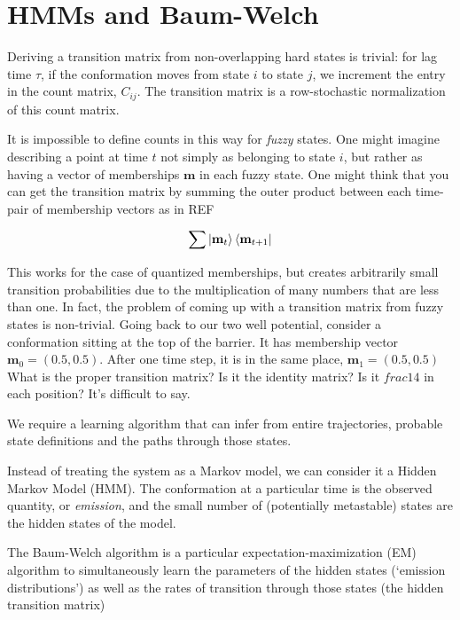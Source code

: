 \documentclass[10pt]{article}
\begin{document}
\section{HMMs and Baum-Welch}

Deriving a transition matrix from non-overlapping hard states is trivial: for lag time
$\tau$, if the conformation moves from state $i$ to state $j$, we increment the entry
in the count matrix, $C_{ij}$. The transition matrix is a row-stochastic normalization of
this count matrix.

It is impossible to define counts in this way for \textit{fuzzy} states. One might
imagine describing a point at time $t$ not simply as belonging to state $i$, but rather as 
having a vector of memberships $\mathbf{m}$ in each fuzzy state. One might think
that you can get the transition matrix by summing the outer product between each
time-pair of membership vectors as in REF

\begin{equation}
\sum \Ket{\mathbf{m}_t} \Bra{\mathbf{m}_{t+1}}
\end{equation}

This works for the case of quantized memberships, but creates
arbitrarily small transition probabilities due to the multiplication
of many numbers that are less than one. In fact, the problem
of coming up with a transition matrix from fuzzy states is non-trivial.
Going back to our two well potential, consider a conformation sitting at
the top of the barrier. It has membership vector $\mathbf{m}_0 = (0.5,0.5)$. 
After one time step, it is in the same place, $\mathbf{m}_1 =(0.5, 0.5)$
What is the proper transition matrix? Is it the identity matrix? Is it
$frac{1}{4}$ in each position? It's difficult to say.

We require a learning algorithm that can infer from entire trajectories, probable
state definitions and the paths through those states.


Instead of treating the system as a Markov model, we can consider it a Hidden
Markov Model (HMM). The conformation
at a particular time is the observed quantity, or \textit{emission}, and the small number of
(potentially metastable) states
are the hidden states of the model. 

The Baum-Welch algorithm is a particular expectation-maximization (EM) algorithm to simultaneously
learn the parameters of the hidden states (`emission distributions') as well as the rates of transition
through those states (the hidden transition matrix)
\end{document}
